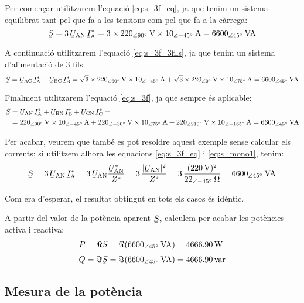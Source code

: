 \begin{exemple}
    Per començar  utilitzarem l'equació \eqref{eq:s_3f_eq}, ja que tenim
    un sistema equilibrat tant pel que fa a les tensions com pel que fa a la càrrega:
    \[
    \cmplx{S} = 3\,\cmplx{U}\ped{AN} \,\cmplx{I}\ped{A}^* =
    3\times \SIpd{220}{90}{V} \times
    \SIpd{10}{-45}{A} = \SIpd{6600}{45}{VA}
    \]

    A continuació  utilitzarem l'equació \eqref{eq:s_3f_3fils}, ja que tenim
    un sistema d'alimentació de 3 fils:
    \[
    \cmplx{S} = \cmplx{U}\ped{AC} \,\cmplx{I}\ped{A}^*
     +  \cmplx{U}\ped{BC} \,\cmplx{I}\ped{B}^* =
    \sqrt{3}\times \SIpd{220}{60}{V} \times
    \SIpd{10}{-45}{A} + \sqrt{3}\times \SIpd{220}{0}{V}
    \times \SIpd{10}{75}{A}  = \SIpd{6600}{45}{VA}
    \]

     Finalment  utilitzarem l'equació \eqref{eq:s_3f}, ja que
     sempre és aplicable:
     \[\begin{split}
     \cmplx{S} &=  \cmplx{U}\ped{AN} \,\cmplx{I}\ped{A}^* +
     \cmplx{U}\ped{BN} \,\cmplx{I}\ped{B}^* +  \cmplx{U}\ped{CN}\,
     \cmplx{I}\ped{C}^* =\\
     &= \SIpd{220}{90}{V}
     \times \SIpd{10}{-45}{A} + \SIpd{220}{-30}{V} \times \SIpd{10}{75}{A}
     + \SIpd{220}{210}{V} \times \SIpd{10}{-165}{A} = \SIpd{6600}{45}{VA}
     \end{split} \]

    Per acabar, veurem que també es pot resoldre aquest exemple
    sense calcular els corrents; si utilitzem alhora les
    equacions \eqref{eq:s_3f_eq} i \eqref{eq:s_mono1}, tenim:
    \[
    \cmplx{S} = 3\,\cmplx{U}\ped{AN} \,\cmplx{I}\ped{A}^* =
    3\,\cmplx{U}\ped{AN}\frac{\cmplx{U}\ped{AN}^*}{\cmplx{Z}^*} =
    3\, \frac{|\cmplx{U}\ped{AN}|^2}{\cmplx{Z}^*} =
    3 \, \frac{(\SI{220}{V})^2}{\SIpd{22}{-45}{\ohm}} =
    \SIpd{6600}{45}{VA}
    \]

    Com era d'esperar, el resultat obtingut en tots els casos
    és idèntic.

    A partir del valor de la potència aparent $\cmplx{S}$, calculem per acabar les potències activa i reactiva:
    \begin{align*}
        P &= \Re\cmplx{S} = \Re(\SIpd{6600}{45}{VA}) = \SI{4666,90}{W}\\[1mm]
        Q &= \Im\cmplx{S} = \Im(\SIpd{6600}{45}{VA}) = \SI{4666,90}{var}
    \end{align*}

\end{exemple}

\subsection{Mesura de la potència}

